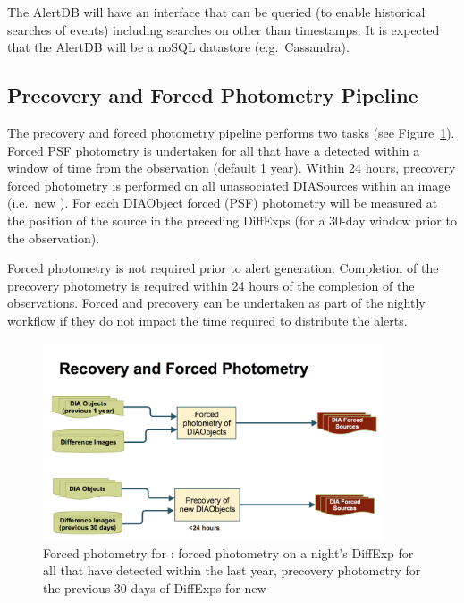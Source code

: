 The AlertDB will have an interface that can be queried (to enable historical searches of events) including searches on other than timestamps. It is expected that the AlertDB will be a noSQL datastore (e.g.\ Cassandra).






\clearpage

\subsection{Precovery and Forced Photometry Pipeline}

The precovery and forced photometry  pipeline performs two tasks (see Figure~\ref{fig:apForcedPrecovery}). Forced PSF photometry is undertaken for all \DIAObjects that have a detected \DIASource within a window of time from the observation (default 1 year).  Within 24 hours, precovery forced photometry is performed on all unassociated DIASources within an image (i.e.\ new \DIAObjects). For each DIAObject forced (PSF) photometry will be measured at the position of the source in the preceding DiffExps (for a 30-day window prior to the observation). 

Forced photometry is not required prior to alert generation. Completion of the precovery photometry is required within 24 hours of the completion of the observations. Forced and precovery can be undertaken as part of the nightly workflow if they do not impact the time required to distribute the alerts.

\begin{figure}[th]
\begin{center}
\includegraphics[width=0.9\textwidth]{figures/Forced_Precovery.png}
\caption{\label{fig:apForcedPrecovery} Forced photometry for \DIAObjects: forced photometry on a night's DiffExp for all \DIAObjects that have detected \DIASources within the last year, precovery photometry for the previous 30 days of DiffExps for new \DIAObjects}
\end{center}
\end{figure} 

